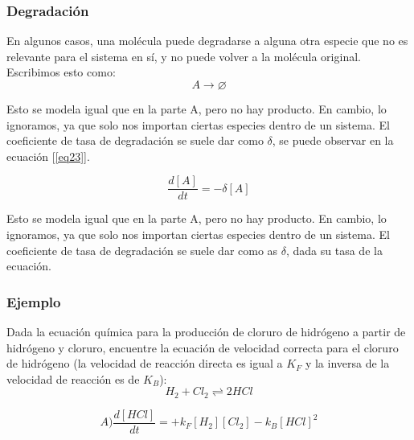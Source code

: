 \documentclass[11pt, letterpaper, spanish]{article}
\begin{document}
{    \subsubsection{Degradación}

    \par{En algunos casos, una molécula puede degradarse a alguna otra especie que no es relevante para el sistema en sí, y no puede volver a la molécula original. Escribimos esto como:}
    \begin{equation}
        A \longrightarrow  \varnothing
    \end{equation}
    \par{Esto se modela igual que en la parte A, pero no hay producto. En cambio, lo ignoramos, ya que solo nos importan ciertas especies dentro de un sistema. El coeficiente de tasa de degradación se suele dar como $\delta$, se puede observar en la ecuación [\ref{eq23}].}

 
    \begin{equation}
        \frac{d [A]}{d t}=-\delta[A]
        \label{eq23}
    \end{equation}

    \par{Esto se modela igual que en la parte A, pero no hay producto. En cambio, lo ignoramos, ya que solo nos importan ciertas especies dentro de un sistema. El coeficiente de tasa de degradación se suele dar como as $\delta$, dada su tasa de la ecuación.}

    \subsubsection{Ejemplo}
    
    \par{Dada la ecuación química para la producción de cloruro de hidrógeno a partir de hidrógeno y cloruro, encuentre la ecuación de velocidad correcta para el cloruro de hidrógeno (la velocidad de reacción directa es igual a $K_F$ y la inversa de la velocidad de reacción es de $K_B$):}
    \begin{equation}
        H_2+{Cl}_2 \rightleftharpoons 2HCl
    \end{equation}
    
    \vspace{2 cm}
    
    \begin{equation}
        A)\frac{d [HCl]}{d t}=+k_F[H_2][{Cl}_2]-k_B[HCl]^2
    \end{equation}

}
\end{document}
